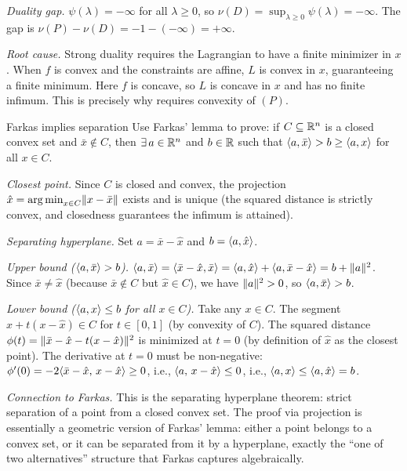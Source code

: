 \textit{Duality gap.}
$\psi(\lambda) = -\infty$ for all $\lambda \geq 0$, so $\nu(D) = \sup_{\lambda \geq 0} \psi(\lambda) = -\infty$.
The gap is $\nu(P) - \nu(D) = -1 - (-\infty) = +\infty$.

\textit{Root cause.}
Strong duality requires the Lagrangian to have a finite minimizer in $x$.
When $f$ is convex and the constraints are affine, $L$ is convex in $x$, guaranteeing a finite minimum.
Here $f$ is concave, so $L$ is concave in $x$ and has no finite infimum.
This is precisely why  requires convexity of $(P)$.

\begin{exercise}{Farkas implies separation}\label{ex:farkas-separation}
	Use Farkas' lemma to prove: if $C \subseteq \mathbb{R}^n$ is a closed convex set and $\bar{x} \notin C$, then $\exists\, a \in \mathbb{R}^n$ and $b \in \mathbb{R}$ such that $\langle a, \bar{x}\rangle > b \geq \langle a, x\rangle$ for all $x \in C$.
\end{exercise}

\solution
\textit{Closest point.}
Since $C$ is closed and convex, the projection $\hat{x} = \operatorname*{arg\,min}_{x \in C} \lVert x - \bar{x}\rVert$ exists and is unique (the squared distance is strictly convex, and closedness guarantees the infimum is attained).

\textit{Separating hyperplane.}
Set $a = \bar{x} - \hat{x}$ and $b = \langle a, \hat{x}\rangle$.

\textit{Upper bound ($\langle a, \bar{x}\rangle > b$).}
$\langle a, \bar{x}\rangle = \langle\bar{x} - \hat{x}, \bar{x}\rangle = \langle a, \hat{x}\rangle + \langle a, \bar{x} - \hat{x}\rangle = b + \lVert a\rVert^2$.
Since $\bar{x} \neq \hat{x}$ (because $\bar{x} \notin C$ but $\hat{x} \in C$), we have $\lVert a\rVert^2 > 0$, so $\langle a, \bar{x}\rangle > b$.

\textit{Lower bound ($\langle a, x\rangle \leq b$ for all $x \in C$).}
Take any $x \in C$.
The segment $\hat{x} + t(x - \hat{x}) \in C$ for $t \in [0, 1]$ (by convexity of $C$).
The squared distance $\phi(t) = \lVert\bar{x} - \hat{x} - t(x - \hat{x})\rVert^2$ is minimized at $t = 0$ (by definition of $\hat{x}$ as the closest point).
The derivative at $t = 0$ must be non-negative:
$\phi'(0) = -2\langle\bar{x} - \hat{x},\, x - \hat{x}\rangle \geq 0$,
i.e., $\langle a,\, x - \hat{x}\rangle \leq 0$, i.e., $\langle a, x\rangle \leq \langle a, \hat{x}\rangle = b$.

\textit{Connection to Farkas.}
This is the separating hyperplane theorem: strict separation of a point from a closed convex set.
The proof via projection is essentially a geometric version of Farkas' lemma: either a point belongs to a convex set, or it can be separated from it by a hyperplane, exactly the ``one of two alternatives'' structure that Farkas captures algebraically.
